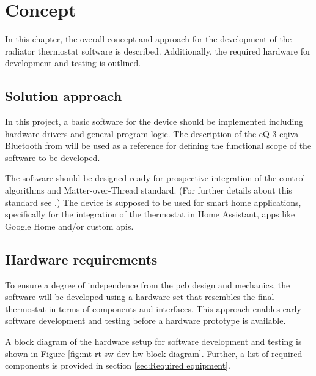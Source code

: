 %
%

\chapter{Concept}
\label{chap:Concept}
In this chapter, the overall concept and approach for the development of the radiator thermostat software is described. Additionally, the required hardware for development and testing is outlined.

\section{Solution approach}
\label{sec:Solution approach}
In this project, a basic software for the device should be implemented including hardware drivers and general program logic. The description of the eQ-3 eqiva Bluetooth from \cite{eQ3AG.05.2018} will be used as a reference for defining the functional scope of the software to be developed.

The software should be designed ready for prospective integration of the control algorithms and Matter-over-Thread standard. (For further details about this standard see \cite{enwiki:matter}.) The device is supposed to be used for smart home applications, specifically for the integration of the thermostat in Home Assistant, apps like Google Home and/or custom \acp{api}.

\section{Hardware requirements}
\label{sec:Hardware requirements}

To ensure a degree of independence from the \acs{pcb} design and mechanics, the software will be developed using a hardware set that resembles the final thermostat in terms of components and interfaces. This approach enables early software development and testing before a hardware prototype is available.

A block diagram of the hardware setup for software development and testing is shown in Figure \ref{fig:mt-rt-sw-dev-hw-block-diagram}. Further, a list of required components is provided in section \ref{sec:Required equipment}.

